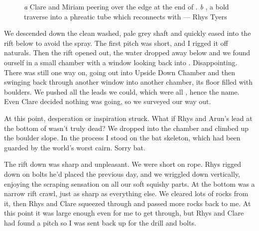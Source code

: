  \begin{figure}[t!]
\checkoddpage \ifoddpage \forcerectofloat \else \forceversofloat \fi
   \centering
     \begin{subfigure}[t]{0.627\textwidth}
        \centering
        \caption{} \label{Top of Upside Down}
    \end{subfigure}
    \hfill
         \begin{subfigure}[t]{0.353\textwidth}
        \centering
        \caption{} \label{Rhys on traverse}
    \end{subfigure}
    \caption{
    \emph{a} Clare and Miriam peering over the edge at the end of \protect{}. 
    \emph{b} \protect{}, a bold traverse into a phreatic tube which reconnects with \protect{} --- Rhys Tyers}
\end{figure}
 
 
We descended down the clean washed, pale grey shaft and quickly eased into the rift below to avoid the spray. The first pitch was short, and I rigged it off naturals. Then the rift opened out, the water dropped away below and we found ourself in a small chamber with a window looking back into . Disappointing. There was still one way on, going out into Upside Down Chamber and then swinging back through another window into another chamber, its floor filled with boulders. We pushed all the leads we could, which were all , hence the name. Even Clare decided nothing was going, so we surveyed our way out.
 
At this point, desperation or inspiration struck. What if Rhys and Arun’s lead at the bottom of  wasn’t truly dead? We dropped into the chamber and climbed up the boulder slope. In the process I stood on the bat skeleton, which had been guarded by the world’s worst cairn. Sorry bat.
 
The rift down was sharp and unpleasant. We were short on rope. Rhys rigged down on bolts he’d placed the previous day, and we wriggled down vertically, enjoying the scraping sensation on all our soft squishy parts. At the bottom was a narrow rift crawl, just as sharp as everything else. We cleared lots of rocks from it, then Rhys and Clare squeezed through and passed more rocks back to me. At this point it was large enough even for me to get through, but Rhys and Clare had found a pitch so I was sent back up for the drill and bolts.
 
